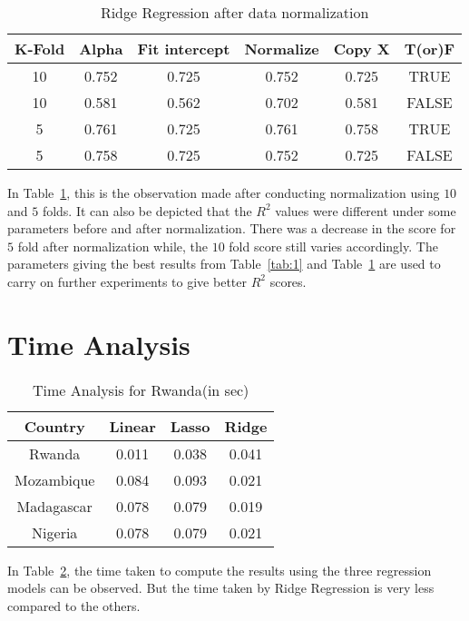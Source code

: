 \begin{table}[h!]
 \caption{Ridge Regression after data normalization} 
\label{tab:2} 
\begin{center}
\begin{tabular}{|c|c|c|c|c|c|} 
\hline
K-Fold & Alpha & Fit intercept & Normalize & Copy X & T(or)F    \\
\hline\hline
10 & 0.752 & 0.725 & 0.752 & 0.725 & TRUE \\ 
10 & 0.581 & 0.562 & 0.702 & 0.581 & FALSE \\ 
5 & 0.761 & 0.725 & 0.761 & 0.758 & TRUE \\ 
5 & 0.758 & 0.725 & 0.752 & 0.725 & FALSE \\ 
\hline\hline
\end{tabular}
\end{center}
\end{table}

In {Table~\ref{tab:2}}, this is the observation made after conducting normalization using $10$ and $5$ folds. It can also be depicted that the \(R^2\) values were different under some parameters before and after normalization. There was a decrease in the score for $5$ fold after normalization while, the $10$ fold score still varies accordingly.\newline
The parameters giving the best results from Table~\ref{tab:1} and Table~\ref{tab:2} are used to carry on further experiments to give better \(R^2\) scores.

\section{Time Analysis}

\begin{table}[h!]
 \caption{Time Analysis for Rwanda(in sec)}
 \label{tab:10} 
\begin{center}
\begin{tabular}{|c|c|c|c|}
\hline
Country & Linear & Lasso & Ridge   \\
\hline\hline
Rwanda & 0.011 & 0.038 & 0.041 \\
Mozambique & 0.084 & 0.093 & 0.021 \\
Madagascar & 0.078 & 0.079 & 0.019\\
Nigeria & 0.078 & 0.079 & 0.021\\
\hline\hline
\end{tabular}
\end{center}
\end{table}
In {Table~\ref{tab:10}}, the time taken to compute the results using the three regression models can be observed. But the time taken by Ridge Regression is very less compared to the others.

